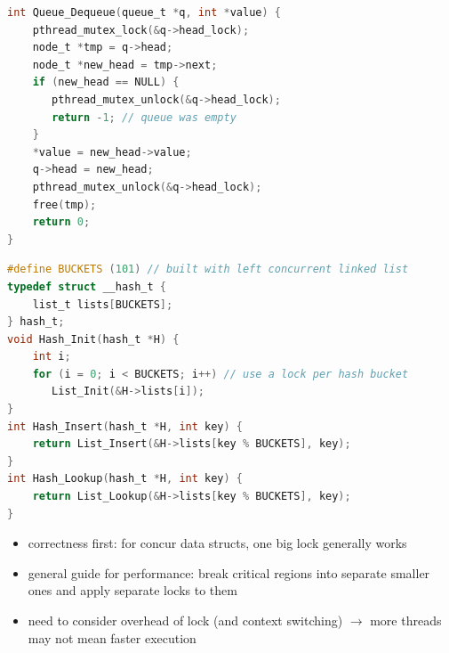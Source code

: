 \documentclass[8pt,a4paper,landscape]{extarticle}
\begin{document}
\begin{multicols*}{3}
\begin{lstlisting}[language=c,xleftmargin=16pt,xrightmargin=6pt,framextopmargin=3pt]
int Queue_Dequeue(queue_t *q, int *value) {
    pthread_mutex_lock(&q->head_lock);
    node_t *tmp = q->head;
    node_t *new_head = tmp->next;
    if (new_head == NULL) {
       pthread_mutex_unlock(&q->head_lock);
       return -1; // queue was empty
    }
    *value = new_head->value;
    q->head = new_head;
    pthread_mutex_unlock(&q->head_lock);
    free(tmp);
    return 0;
}
\end{lstlisting}
\begin{lstlisting}[language=c,xleftmargin=16pt,xrightmargin=6pt]
#define BUCKETS (101) // built with left concurrent linked list
typedef struct __hash_t {
    list_t lists[BUCKETS];
} hash_t;
void Hash_Init(hash_t *H) {
    int i;
    for (i = 0; i < BUCKETS; i++) // use a lock per hash bucket
       List_Init(&H->lists[i]);
}
int Hash_Insert(hash_t *H, int key) {
    return List_Insert(&H->lists[key % BUCKETS], key);
}
int Hash_Lookup(hash_t *H, int key) {
    return List_Lookup(&H->lists[key % BUCKETS], key);
}
\end{lstlisting}
\begin{itemize}
\item correctness first: for concur data structs, one big lock generally works
\item general guide for performance: break critical regions into separate smaller ones and apply separate locks to them
\item need to consider overhead of lock (and context switching) $\to$ more threads may not mean faster execution
\end{itemize}
\end{multicols*}
\end{document}
